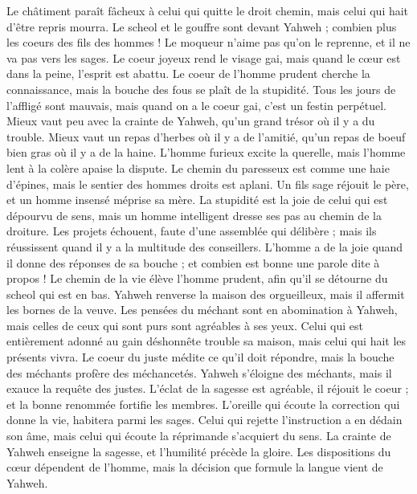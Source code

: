 \begin{multicols}{2}
Le châtiment paraît fâcheux à celui qui quitte le droit chemin, mais celui qui hait d'être repris mourra.
Le scheol et le gouffre sont devant Yahweh ; combien plus les coeurs des fils des hommes !
Le moqueur n'aime pas qu'on le reprenne, et il ne va pas vers les sages.
Le coeur joyeux rend le visage gai, mais quand le cœur est dans la peine, l'esprit est abattu.
Le coeur de l'homme prudent cherche la connaissance, mais la bouche des fous se plaît de la stupidité.
Tous les jours de l'affligé sont mauvais, mais quand on a le coeur gai, c'est un festin perpétuel.
Mieux vaut peu avec la crainte de Yahweh, qu'un grand trésor où il y a du trouble.
Mieux vaut un repas d'herbes où il y a de l'amitié, qu'un repas de boeuf bien gras où il y a de la haine.
L'homme furieux excite la querelle, mais l'homme lent à la colère apaise la dispute.
Le chemin du paresseux est comme une haie d’épines, mais le sentier des hommes droits est aplani.
Un fils sage réjouit le père, et un homme insensé méprise sa mère.
La stupidité est la joie de celui qui est dépourvu de sens, mais un homme intelligent dresse ses pas au chemin de la droiture.
Les projets échouent, faute d’une assemblée qui délibère ; mais ils réussissent quand il y a la multitude des conseillers.
L'homme a de la joie quand il donne des réponses de sa bouche ; et combien est bonne une parole dite à propos !
Le chemin de la vie élève l'homme prudent, afin qu'il se détourne du scheol qui est en bas.
Yahweh renverse la maison des orgueilleux, mais il affermit les bornes de la veuve.
Les pensées du méchant sont en abomination à Yahweh, mais celles de ceux qui sont purs sont agréables à ses yeux.
Celui qui est entièrement adonné au gain déshonnête trouble sa maison, mais celui qui hait les présents vivra.
Le coeur du juste médite ce qu'il doit répondre, mais la bouche des méchants profère des méchancetés.
Yahweh s’éloigne des méchants, mais il exauce la requête des justes.
L’éclat de la sagesse est agréable, il réjouit le coeur ; et la bonne renommée fortifie les membres.
L'oreille qui écoute la correction qui donne la vie, habitera parmi les sages.
Celui qui rejette l'instruction a en dédain son âme, mais celui qui écoute la réprimande s'acquiert du sens.
La crainte de Yahweh enseigne la sagesse, et l'humilité précède la gloire.
\VerseOne{}Les dispositions du cœur dépendent de l'homme, mais la décision que formule la langue vient de Yahweh.

\end{multicols}
